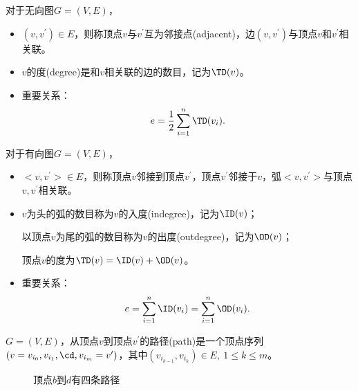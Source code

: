 \begin{frame}\ft{\subsubsecname}
\begin{dingyi}[无向图顶点的邻接、度]
对于无向图$G=(V,E)$，
\begin{itemize}
\item 
{}$(v,v^\prime)\in E$，则称顶点$v$与$v^\prime$互为邻接点(adjacent)，边$(v,v^\prime)$与顶点$v$和$v^\prime$相关联。 \\[0.1in]
\item 
{}$v$的度(degree)是和$v$相关联的边的数目，记为$\TD(v)$。\\[0.1in]
\item 重要关系：
$$
e=\frac12 \sum_{i=1}^n \TD(v_i).
$$
\end{itemize}
\end{dingyi}
\end{frame}

\begin{frame}\ft{\subsubsecname}
\begin{dingyi}
对于有向图$G=(V,E)$，
\begin{itemize}
\item 
{}$<v,v^\prime>\in E$，则称顶点$v$邻接到顶点$v^\prime$，顶点$v^\prime$邻接于$v$，弧$<v,v^\prime>$与顶点$v,v^\prime$相关联。 \\[0.1in]
\item 
{}$v$为头的弧的数目称为$v$的入度(indegree)，记为$\ID(v)$；

以顶点$v$为尾的弧的数目称为$v$的出度(outdegree)，记为$\OD(v)$；

顶点$v$的度为$\TD(v)=\ID(v)+\OD(v)$。\\[0.1in]
\item 重要关系：
$$
e=\sum_{i=1}^n \ID(v_i)=\sum_{i=1}^n \OD(v_i).
$$
\end{itemize}
\end{dingyi}
\end{frame}

\begin{frame}\ft{\subsubsecname}
\begin{dingyi}[无向图的路径]
$G=(V,E)$，从顶点$v$到顶点$v^\prime$的路径(path)是一个顶点序列$(v=v_{i_0}, v_{i_1}, \cd, v_{i_m}=v^\prime)$，其中$(v_{i_{k-1}},v_{i_{k}})\in E, ~1\le k \le m$。
\end{dingyi}
\end{frame}

\begin{frame}\ft{\subsubsecname}
\begin{figure}
\centering

\caption{顶点$b$到$d$有四条路径}
\end{figure}

\end{frame}

